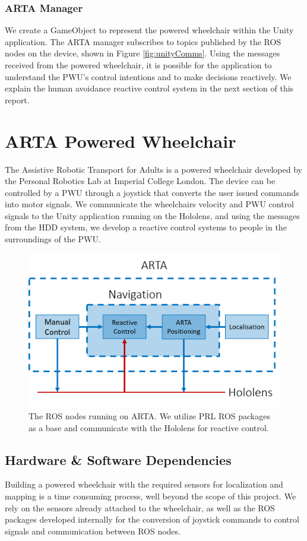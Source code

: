 \subsubsection{ARTA Manager}
We create a GameObject to represent the powered wheelchair within the Unity application. The ARTA manager subscribes to topics published by the ROS nodes on the device, shown in Figure \ref{fig:unityComms}. Using the messages received from the powered wheelchair, it is possible for the application to understand the PWU's control intentions and to make decisions reactively. We explain the human avoidance reactive control system in the next section of this report.

\section{ARTA Powered Wheelchair}
The Assistive Robotic Transport for Adults is a powered wheelchair developed by the Personal Robotics Lab at Imperial College London. The device can be controlled by a PWU through a joystick that converts the user issued commands into motor signals. We communicate the wheelchairs velocity and PWU control signals to the Unity application running on the Hololens, and using the messages from the HDD system, we develop a reactive control systems to people in the surroundings of the PWU. 

\begin{figure}[ht]
	\centering
	\includegraphics[width=0.8\linewidth]{img/chapter5_implementation/artaSystemDiagram.png}
	\caption{The ROS nodes running on ARTA. We utilize PRL ROS packages as a base and communicate with the Hololens for reactive control.}
	\label{fig:detailedARTA}
\end{figure}


\subsection{Hardware \& Software Dependencies}
Building a powered wheelchair with the required sensors for localization and mapping is a time consuming process, well beyond the scope of this project. We rely on the sensors already attached to the wheelchair, as well as the ROS packages developed internally for the conversion of joystick commands to control signals and communication between ROS nodes.

